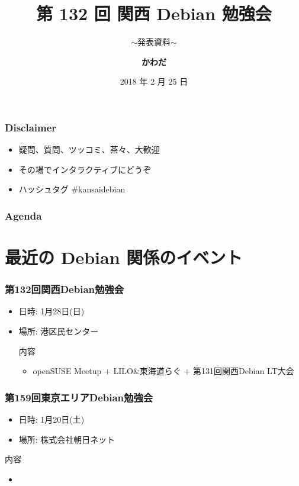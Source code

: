 \documentclass[cjk,dvipdfmx,10pt,compress,%
hyperref={bookmarks=true,bookmarksnumbered=true,bookmarksopen=false,%
colorlinks=false,%
pdftitle={第 132 回 関西 Debian 勉強会},%
pdfauthor={かわだ},%
pdfsubject={資料},%
}]{beamer}
\title{第 132 回 関西 Debian 勉強会}
\subtitle{$\sim$発表資料$\sim$}
\author[かわだ てつたろう]{{\large\bf かわだ}}
\institute[Debian JP]{{\normalsize\tt 関西 Debian 勉強会}}
\date{{\small 2018 年 2 月 25 日}}
\begin{document}
\settitleslide
\begin{frame}
\titlepage
\end{frame}
\setdefaultslide

\begin{frame}[fragile]
  \frametitle{Disclaimer}
  \begin{itemize}
  \item 疑問、質問、ツッコミ、茶々、\alert{大歓迎}
  \item その場でインタラクティブにどうぞ
  \item ハッシュタグ \#kansaidebian
  \end{itemize}
\end{frame}

\begin{frame}[fragile]
\frametitle{Agenda}

\tableofcontents

\end{frame}

\section{最近の Debian 関係のイベント}

\begin{frame}[fragile]
  \frametitle{第132回関西Debian勉強会}
  \begin{itemize}
  \item 日時: 1月28日(日)
  \item 場所: 港区民センター
  \begin{block}{内容}
    \begin{itemize}
    \item openSUSE Meetup + LILO\&東海道らぐ + 第131回関西Debian LT大会
    \end{itemize}
  \end{block}
\end{itemize}
\end{frame}

\begin{frame}[fragile]
  \frametitle{第159回東京エリアDebian勉強会}
  \begin{itemize}
  \item 日時: 1月20日(土)
  \item 場所: 株式会社朝日ネット
  \end{itemize}
  \begin{block}{内容}
    \begin{itemize}
    \item 
    \end{itemize}
  \end{block}
\end{frame}
\end{document}
